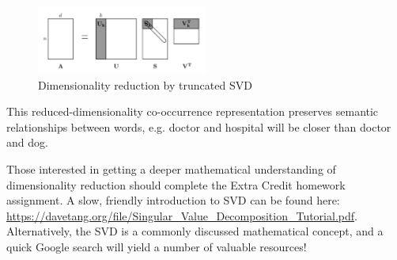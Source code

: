 \begin{figure}[h]
    \centering
    \includegraphics[width=0.5\textwidth]{svd.png}
    \caption{Dimensionality reduction by truncated SVD}
    \label{fig:svd}
\end{figure}

This reduced-dimensionality co-occurrence representation preserves semantic relationships between words, e.g. doctor and hospital will be closer than doctor and dog. \newline

Those interested in getting a deeper mathematical understanding of dimensionality reduction should complete the Extra Credit homework assignment. A slow, friendly introduction to SVD can be found here: \url{https://davetang.org/file/Singular_Value_Decomposition_Tutorial.pdf}. Alternatively, the SVD is a commonly discussed mathematical concept, and a quick Google search will yield a number of valuable resources! 
